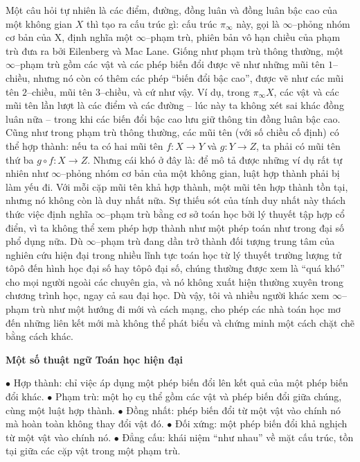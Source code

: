 \begin{multicols}{2}
	Một câu hỏi tự nhiên là các điểm, đường, đồng luân và đồng luân bậc cao của một không gian $X$ thì tạo ra cấu trúc gì: cấu trúc $\pi_\infty$ này, gọi là $\infty$--phỏng nhóm cơ bản của X, định nghĩa một $\infty$--phạm trù, phiên bản vô hạn chiều của phạm trù đưa ra bởi Eilenberg và Mac Lane. Giống như phạm trù thông thường, một $\infty$--phạm trù gồm các vật và các phép biến đổi được vẽ như những mũi tên $1$--chiều, nhưng nó còn có thêm các phép ``biến đổi bậc cao'', được vẽ như các mũi tên $2$--chiều, mũi tên $3$--chiều, và cứ như vậy. Ví dụ, trong $\pi_\infty X$, các vật và các mũi tên lần lượt là các điểm và các đường -- lúc này ta không xét sai khác đồng luân nữa -- trong khi các biến đổi bậc cao lưu giữ thông tin đồng luân bậc cao. Cũng như trong phạm trù thông thường, các mũi tên (với số chiều cố định) có thể hợp thành: nếu ta có hai mũi tên $f: X \to Y$ và $g: Y \to Z$, ta phải có mũi tên thứ ba $g \circ f: X \to Z$. Nhưng cái khó ở đây là: để mô tả được những ví dụ rất tự nhiên như $\infty$--phỏng nhóm cơ bản của một không gian, luật hợp thành phải bị làm yếu đi. Với mỗi cặp mũi tên khả hợp thành, một mũi tên hợp thành tồn tại, nhưng nó không còn là duy nhất nữa.
	\vskip 0.1cm
	Sự thiếu sót của tính duy nhất này thách thức việc định nghĩa $\infty$--phạm trù bằng cơ sở toán học bởi lý thuyết tập hợp cổ điển, vì ta không thể xem phép hợp thành như một phép toán như trong đại số phổ dụng nữa. Dù $\infty$--phạm trù đang dần trở thành đối tượng trung tâm của nghiên cứu hiện đại trong nhiều lĩnh tực toán học từ lý thuyết trường lượng tử tôpô đến hình học đại số hay tôpô đại số, chúng thường được xem là ``quá khó'' cho mọi người ngoài các chuyên gia, và nó không xuất hiện thường xuyên trong chương trình học, ngay cả sau đại học. Dù vậy, tôi và nhiều người khác xem $\infty$--phạm trù như một hướng đi mới và cách mạng, cho phép các nhà toán học mơ đến những liên kết mới mà không thể phát biểu và chứng minh một cách chặt chẽ bằng cách khác.
	\vskip 0.1cm
	\centerline{\bf\color{duongvaotoanhoc}Một số thuật ngữ Toán học hiện đại}
	\vskip 0.1cm
	$\bullet$ Hợp thành: chỉ việc áp dụng một phép biến đổi lên kết quả của một phép biến đổi khác.
	\vskip 0.1cm	
	$\bullet$ Phạm trù: một họ cụ thể gồm các vật và phép biến đổi giữa chúng, cùng một luật hợp thành.
	\vskip 0.1cm	
	$\bullet$ Đồng nhất: phép biến đổi từ một vật vào chính nó mà hoàn toàn không thay đổi vật đó.
	\vskip 0.1cm			
	$\bullet$ Đối xứng: một phép biến đổi khả nghịch từ một vật vào chính nó.
	\vskip 0.1cm	
	$\bullet$ Đẳng cấu: khái niệm ``như nhau'' về mặt cấu trúc, tồn tại giữa các cặp vật trong một phạm trù.

\end{multicols}

